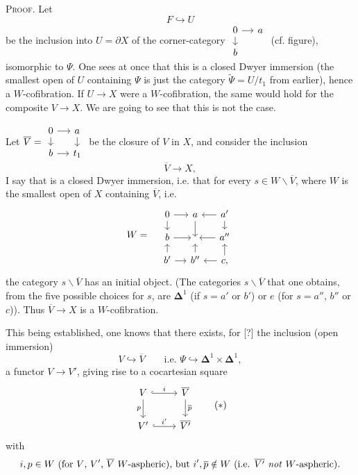 \textsc{Proof}. Let
\[ F \hookrightarrow U \]
be the inclusion into $U = \partial X$ of the corner-category $\vcenter{\hbox{\begin{tikzcd}[row sep=small, column sep=small]
0 \arrow[r] \arrow[d] & a \\
b &
\end{tikzcd}}}$ (cf. figure), isomorphic to $\Psi$. One sees at once that this is a closed Dwyer immersion (the smallest open of $U$ containing $\Psi$ is just the category $\tilde{\Psi} = U/t_1$ from earlier), hence a $W$-cofibration. If $U \longrightarrow X$ were a $W$-cofibration, the same would hold for the composite $V \longrightarrow X$. We are going to see that this is not the case.

Let $\overline{V} = \vcenter{\hbox{\begin{tikzcd}[row sep=small, column sep=small]
0 \arrow[r] \arrow[d] & a \arrow[d] \\
b \arrow[r] & t_1
\end{tikzcd}}}$ be the closure of $V$ in $X$,
and consider the inclusion
\[ \overline{V} \longrightarrow X, \]
I say that is a closed Dwyer immersion, i.e. that for every $s \in W\backslash\overline{V}$, where $W$ is the smallest open of $X$ containing $\overline{V}$, i.e.
\[
W = \quad
\begin{tikzcd}[row sep=small, column sep=small]
0 \arrow[r] \arrow[d] & a \arrow[d] & a' \arrow[l] \arrow[d] \\
b \arrow[r] & {} & a'' \arrow[l] \\
b' \arrow[u] \arrow[r] & b'' \arrow[u] & c, \arrow[l] \arrow[u]
\end{tikzcd}
\]
the category $s\backslash\overline{V}$ has an initial object. (The categories $s\backslash\overline{V}$ that one obtains, from the five possible choices for $s$, are $\boldsymbol{\Delta}^1$ (if $s = a'$ or $b'$) or $e$ (for $s = a''$, $b''$ or $c$)). Thus $\overline{V} \longrightarrow X$ is a $W$-cofibration.

This being established, one knows that there exists, for [?] the inclusion (open immersion)
\[ V \hookrightarrow \overline{V} \qquad \text{i.e. } \Psi \hookrightarrow \boldsymbol{\Delta}^1 \times \boldsymbol{\Delta}^1, \]
a functor $V \longrightarrow V'$, giving rise to a cocartesian square
\[
\begin{tikzcd}
V \arrow[r, hook, "i"] \arrow[d, "p"'] & \overline{V} \arrow[d, "\overline{p}"] \\
V' \arrow[r, hook, "i'"] & \overline{V'}
\end{tikzcd}
\tag*{$(*)$}
\]
with
\[ i, p \in W \ \text{(for $V$, $V'$, $\overline{V}$ $W$-aspheric), but } i', \overline{p} \notin W \ \text{(i.e. $\overline{V'}$ \textit{not} $W$-aspheric).} \]

